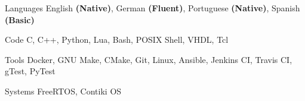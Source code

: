 
\begin{cvskills}
  \cvskill
    {Languages} %
    {English \textbf{(Native)}, German \textbf{(Fluent)}, Portuguese \textbf{(Native)}, Spanish \textbf{(Basic)}} %

  \cvskill
    {Code} %
    {C, C++, Python, Lua, Bash, POSIX Shell, VHDL, Tcl} %

  \cvskill
    {Tools} %
    {Docker, GNU Make, CMake, Git, Linux, Ansible, Jenkins CI, Travis CI, gTest, PyTest} %

  \cvskill
    {Systems} %
    {FreeRTOS, Contiki OS} %
\end{cvskills}
